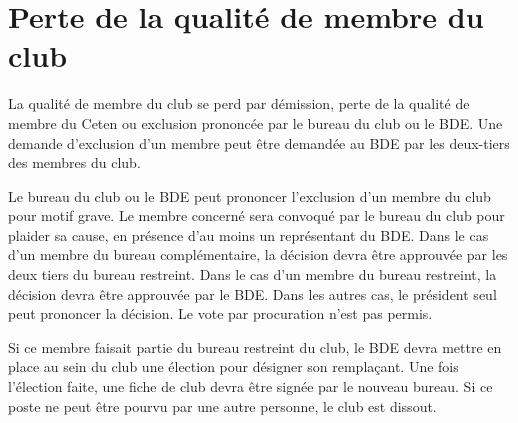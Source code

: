 \documentclass{article}
\begin{document}
\begin{multicols}{2}
{		}
		
		\section{Perte de la qualité de membre du club}
\label{sec:perte_de_la_qualite_de_membre_du_club}

		{\small

			La qualité de membre du club se perd par démission, perte de la
			qualité de membre du Ceten ou exclusion prononcée par le bureau du
			club ou le BDE\@. Une demande d’exclusion d’un membre peut être
			demandée au BDE par les deux-tiers des membres du club.

			Le bureau du club ou le BDE peut prononcer l’exclusion d’un membre
			du club pour motif grave. Le membre concerné sera convoqué par le
			bureau du club pour plaider sa cause, en présence d'au moins un
			représentant du BDE\@. Dans le cas d'un membre du bureau
			complémentaire, la décision devra être approuvée par les deux
			tiers du bureau restreint. Dans le cas d'un membre du bureau
			restreint, la décision devra être approuvée par le BDE\@. Dans les
			autres cas, le président seul peut prononcer la décision. Le vote
			par procuration n’est pas permis.

			Si ce membre faisait partie du bureau restreint du club, le BDE
			devra mettre en place au sein du club une élection pour désigner son
			remplaçant. Une fois l’élection faite, une fiche de club devra être
			signée par le nouveau bureau. Si ce poste ne peut être pourvu par
			une autre personne, le club est dissout.

		}
		
	\end{multicols}
\end{document}
